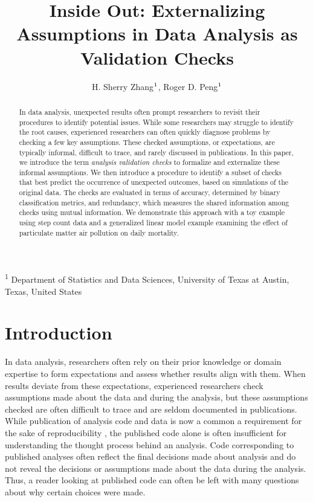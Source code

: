 \documentclass[
  12pt,
]{interact}
\title{Inside Out: Externalizing Assumptions in Data Analysis as
Validation Checks}
\author{H. Sherry Zhang$\textsuperscript{1}$, Roger D.
Peng$\textsuperscript{1}$}
\begin{document}
\captionsetup{labelsep=space}
\maketitle
\textsuperscript{1} Department of Statistics and Data
Sciences, University of Texas at Austin, Texas, United States
\begin{abstract}
In data analysis, unexpected results often prompt researchers to revisit
their procedures to identify potential issues. While some researchers
may struggle to identify the root causes, experienced researchers can
often quickly diagnose problems by checking a few key assumptions. These
checked assumptions, or expectations, are typically informal, difficult
to trace, and rarely discussed in publications. In this paper, we
introduce the term \emph{analysis validation checks} to formalize and
externalize these informal assumptions. We then introduce a procedure to
identify a subset of checks that best predict the occurrence of
unexpected outcomes, based on simulations of the original data. The
checks are evaluated in terms of accuracy, determined by binary
classification metrics, and redundancy, which measures the shared
information among checks using mutual information. We demonstrate this
approach with a toy example using step count data and a generalized
linear model example examining the effect of particulate matter air
pollution on daily mortality.
\end{abstract}


\section{Introduction}\label{introduction}

In data analysis, researchers often rely on their prior knowledge or
domain expertise to form expectations and assess whether results align
with them. When results deviate from these expectations, experienced
researchers check assumptions made about the data and during the
analysis, but these assumptions checked are often difficult to trace and
are seldom documented in publications. While publication of analysis
code and data is now a common a requirement for the sake of
reproducibility \citep{peng2011reproducible}, the published code alone
is often insufficient for understanding the thought process behind an
analysis. Code corresponding to published analyses often reflect the
final decisions made about analysis and do not reveal the decisions or
assumptions made about the data during the analysis. Thus, a reader
looking at published code can often be left with many questions about
why certain choices were made.
\end{document}
